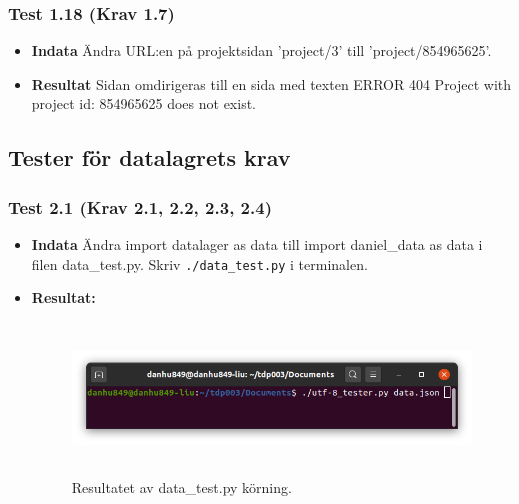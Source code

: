 \documentclass{TDP003mall}
\begin{document}
\subsubsection*{Test 1.18 (Krav 1.7)}
\begin{itemize}
\item[]\textbf{Indata} Ändra URL:en på projektsidan 'project/3' till 'project/854965625'.
\item[]\textbf{Resultat} Sidan omdirigeras till en sida med texten ERROR 404 Project with project id: 854965625 does not exist. 
\end{itemize}




\subsection{Tester för datalagrets krav}
\subsubsection*{Test 2.1 (Krav 2.1, 2.2, 2.3, 2.4)}
\begin{itemize}
\item[]\textbf{Indata} Ändra import datalager as data till import daniel\_data as data i filen data\_test.py. Skriv \texttt{./data\_test.py} i terminalen.
\item[]\textbf{Resultat:}
\begin{figure}[h!]
\centerline{\includegraphics[width=\textwidth, height=4cm]{../Pictures/utf-8_tester_test.png}}
\caption{Resultatet av data\_test.py körning.\label{fig:}}
\end{figure}
\end{itemize}
\end{document}
